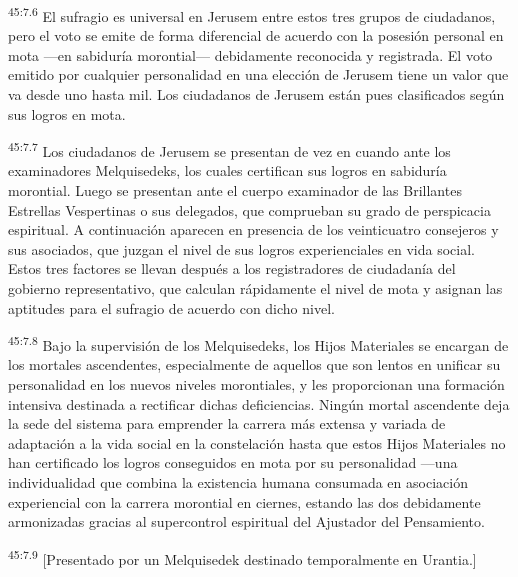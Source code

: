 \par
\textsuperscript{45:7.6} El sufragio es universal en Jerusem entre estos tres grupos de ciudadanos, pero el voto se emite de forma diferencial de acuerdo con la posesión personal en mota ---en sabiduría morontial--- debidamente reconocida y registrada. El voto emitido por cualquier personalidad en una elección de Jerusem tiene un valor que va desde uno hasta mil. Los ciudadanos de Jerusem están pues clasificados según sus logros en mota.

\par
\textsuperscript{45:7.7} Los ciudadanos de Jerusem se presentan de vez en cuando ante los examinadores Melquisedeks, los cuales certifican sus logros en sabiduría morontial. Luego se presentan ante el cuerpo examinador de las Brillantes Estrellas Vespertinas o sus delegados, que comprueban su grado de perspicacia espiritual. A continuación aparecen en presencia de los veinticuatro consejeros y sus asociados, que juzgan el nivel de sus logros experienciales en vida social. Estos tres factores se llevan después a los registradores de ciudadanía del gobierno representativo, que calculan rápidamente el nivel de mota y asignan las aptitudes para el sufragio de acuerdo con dicho nivel.

\par
\textsuperscript{45:7.8} Bajo la supervisión de los Melquisedeks, los Hijos Materiales se encargan de los mortales ascendentes, especialmente de aquellos que son lentos en unificar su personalidad en los nuevos niveles morontiales, y les proporcionan una formación intensiva destinada a rectificar dichas deficiencias. Ningún mortal ascendente deja la sede del sistema para emprender la carrera más extensa y variada de adaptación a la vida social en la constelación hasta que estos Hijos Materiales no han certificado los logros conseguidos en mota por su personalidad ---una individualidad que combina la existencia humana consumada en asociación experiencial con la carrera morontial en ciernes, estando las dos debidamente armonizadas gracias al supercontrol espiritual del Ajustador del Pensamiento.

\par
\textsuperscript{45:7.9} [Presentado por un Melquisedek destinado temporalmente en Urantia.]